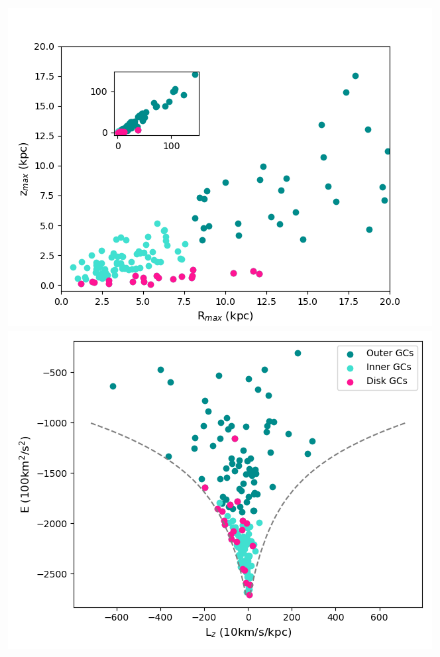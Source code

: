 \begin{figure}
\begin{center}
                \includegraphics[clip=true, trim = 0mm 0mm 0mm 0mm, width=\columnwidth]{images/PII_orbitparams_Rzmax.png}
                \includegraphics[clip=true, trim = 0mm 0mm 0mm 0mm, width=\columnwidth]{images/PII_orbitparams_ELz_class.png}

\end{center}
\end{figure}

